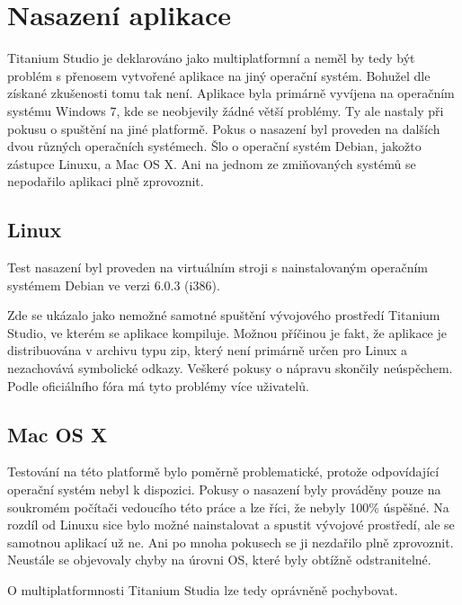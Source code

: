 \chapter{Nasazení aplikace}

Titanium Studio je deklarováno jako multiplatformní a neměl by tedy být problém s přenosem vytvořené aplikace na jiný operační systém. Bohužel dle získané zkušenosti tomu tak není. Aplikace byla primárně vyvíjena na operačním systému Windows 7, kde se neobjevily žádné větší problémy. Ty ale nastaly při pokusu o spuštění na jiné platformě. Pokus o nasazení byl proveden na dalších dvou různých operačních systémech. Šlo o operační systém Debian\cite{debian}, jakožto zástupce Linuxu, a Mac OS X\cite{mac}. Ani na jednom ze zmiňovaných systémů se nepodařilo aplikaci plně zprovoznit. 

\section{Linux}
Test nasazení byl proveden na virtuálním stroji s nainstalovaným operačním systémem Debian ve verzi 6.0.3 (i386).

Zde se ukázalo jako nemožné samotné spuštění vývojového prostředí Titanium Studio, ve kterém se aplikace kompiluje. Možnou příčinou je fakt, že aplikace je distribuována v archivu typu zip, který není primárně určen pro Linux a nezachovává symbolické odkazy. Veškeré pokusy o nápravu skončily neúspěchem. Podle oficiálního fóra má tyto problémy více uživatelů.

\section{Mac OS X}

Testování na této platformě bylo poměrně problematické, protože odpovídající operační systém nebyl k dispozici. Pokusy o nasazení byly prováděny pouze na soukromém počítači vedoucího této práce a lze říci, že nebyly 100\% úspěšné. Na rozdíl od Linuxu sice bylo možné nainstalovat a spustit vývojové prostředí, ale se samotnou aplikací už ne. Ani po mnoha pokusech se ji nezdařilo plně zprovoznit. Neustále se objevovaly chyby na úrovni OS, které byly obtížně odstranitelné.

O multiplatformnosti Titanium Studia lze tedy oprávněně pochybovat.